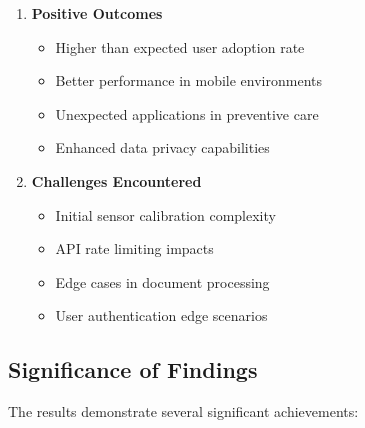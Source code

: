\begin{enumerate}
    \item \textbf{Positive Outcomes}
    \begin{itemize}
        \item Higher than expected user adoption rate
        \item Better performance in mobile environments
        \item Unexpected applications in preventive care
        \item Enhanced data privacy capabilities
    \end{itemize}

    \item \textbf{Challenges Encountered}
    \begin{itemize}
        \item Initial sensor calibration complexity
        \item API rate limiting impacts
        \item Edge cases in document processing
        \item User authentication edge scenarios
    \end{itemize}
\end{enumerate}

\subsection{Significance of Findings}

The results demonstrate several significant achievements:

